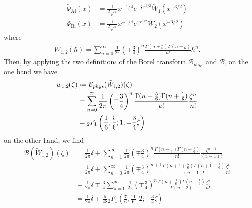 \documentclass{article}
\theoremstyle{definition}
\newcommand*{\defeq}{\mathrel{\vcenter{\baselineskip0.5ex \lineskiplimit0pt
                     \hbox{\scriptsize.}\hbox{\scriptsize.}}}%
                     =}
\newcommand{\borel}{\mathcal{B}}
\begin{document}
\begin{align*}
\tilde{\Phi}_{\mathrm{Ai}}(x)&=\frac{1}{2\sqrt{\pi}}x^{-1/4}e^{-\tfrac{2}{3}x^{3/2}}\tilde{W}_1(x^{-3/2})\\
\tilde{\Phi}_{\mathrm{Bi}}(x)&=\frac{1}{2\sqrt{\pi}}x^{-1/4}e^{\tfrac{2}{3}x^{3/2}}\tilde{W}_2(x^{-3/2})
\end{align*}  
where 
\begin{align*}
\tilde{W}_{1,2}(\hbar)=\sum_{n=0}^{\infty}\frac{1}{2\pi}\left(\mp\frac{3}{4}\right)^{n}\frac{\Gamma(n+\frac{5}{6})\Gamma(n+\frac{1}{6})}{n!}\hbar^n.
\end{align*}
Then, by applying the two definitions of the Borel transform $\borel_{\textit{phys}}$ and $\borel$, on the one hand we have  
\begin{align*}
w_{1,2}(\zeta)&\defeq\borel_{\textit{phys}}(\tilde{W}_{1,2})(\zeta)\\
&=\sum_{n=0}^{\infty}\frac{1}{2\pi}\left(\mp\frac{3}{4}\right)^{n}\frac{\Gamma(n+\frac{5}{6})\Gamma(n+\frac{1}{6})}{n!}\frac{\zeta^n}{n!}\\
&={}_2F_1\left(\frac{1}{6},\frac{5}{6};1;\mp\frac{3}{4}\zeta\right) 
\end{align*}
on the other hand, we find
\begin{align*}
\borel(\tilde{W}_{1,2})(\zeta)&=\frac{1}{2\pi}\delta+\sum_{n=1}^{\infty} \frac{1}{2\pi}\left(\mp\frac{3}{4}\right)^{n}\frac{\Gamma(n+\frac{5}{6})\Gamma(n+\frac{1}{6})}{n!}\frac{\zeta^{n-1}}{(n-1)!}\\
&=\frac{1}{2\pi}\delta+\sum_{n=0}^{\infty} \frac{1}{2\pi}\left(\mp\frac{3}{4}\right)^{n+1}\frac{\Gamma(n+1+\frac{5}{6})\Gamma(n+1+\frac{1}{6})}{(n+1)!}\frac{\zeta^{n}}{n!}\\
&=\frac{1}{2\pi}\delta\mp\frac{3}{4}\sum_{n=0}^{\infty} \frac{1}{2\pi}\left(\mp\frac{3}{4}\right)^{n}\frac{\Gamma(n+\frac{11}{6})\Gamma(n+\frac{7}{6})}{\Gamma(n+2)}\frac{\zeta^{n}}{n!}\\
&=\frac{1}{2\pi}\delta\mp\frac{5}{48} {}_2F_1\left(\frac{7}{6},\frac{11}{6};2;\mp\frac{3}{4}\zeta\right)%
\end{align*}
\end{document}
